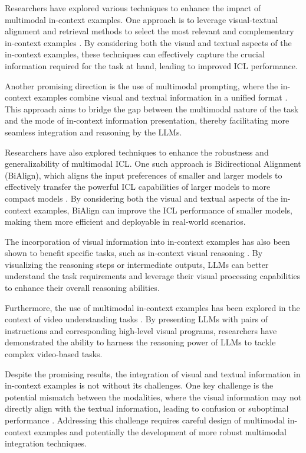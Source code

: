 \documentclass[11pt]{article}
\begin{document}
Researchers have explored various techniques to enhance the impact of multimodal in-context examples. One approach is to leverage visual-textual alignment and retrieval methods to select the most relevant and complementary in-context examples \cite{ref293,ref296}. By considering both the visual and textual aspects of the in-context examples, these techniques can effectively capture the crucial information required for the task at hand, leading to improved ICL performance.

Another promising direction is the use of multimodal prompting, where the in-context examples combine visual and textual information in a unified format \cite{ref294,ref298}. This approach aims to bridge the gap between the multimodal nature of the task and the mode of in-context information presentation, thereby facilitating more seamless integration and reasoning by the LLMs.

Researchers have also explored techniques to enhance the robustness and generalizability of multimodal ICL. One such approach is Bidirectional Alignment (BiAlign), which aligns the input preferences of smaller and larger models to effectively transfer the powerful ICL capabilities of larger models to more compact models \cite{ref295}. By considering both the visual and textual aspects of the in-context examples, BiAlign can improve the ICL performance of smaller models, making them more efficient and deployable in real-world scenarios.

The incorporation of visual information into in-context examples has also been shown to benefit specific tasks, such as in-context visual reasoning \cite{ref299}. By visualizing the reasoning steps or intermediate outputs, LLMs can better understand the task requirements and leverage their visual processing capabilities to enhance their overall reasoning abilities.

Furthermore, the use of multimodal in-context examples has been explored in the context of video understanding tasks \cite{ref300}. By presenting LLMs with pairs of instructions and corresponding high-level visual programs, researchers have demonstrated the ability to harness the reasoning power of LLMs to tackle complex video-based tasks.

Despite the promising results, the integration of visual and textual information in in-context examples is not without its challenges. One key challenge is the potential mismatch between the modalities, where the visual information may not directly align with the textual information, leading to confusion or suboptimal performance \cite{ref297}. Addressing this challenge requires careful design of multimodal in-context examples and potentially the development of more robust multimodal integration techniques.
\end{document}
